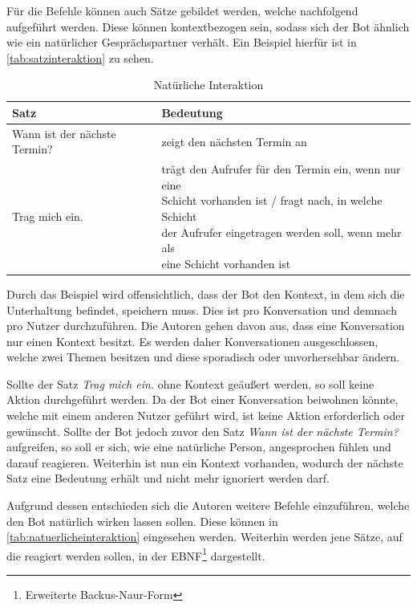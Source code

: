 Für die Befehle können auch Sätze gebildet werden, welche nachfolgend aufgeführt werden. Diese können kontextbezogen sein, sodass sich der Bot ähnlich wie ein natürlicher Gesprächspartner verhält. Ein Beispiel hierfür ist in \autoref{tab:satzinteraktion} zu sehen.

\begin{table}[H]
\centering
\begin{tabular}{|l|l|}
\hline
\textbf{Satz} & \textbf{Bedeutung }\\
 \hline
Wann ist der nächste Termin? & zeigt den nächsten Termin an \\
\hline
Trag mich ein. & \makecell{trägt den Aufrufer für den Termin ein, wenn nur eine\\ Schicht vorhanden ist / fragt nach, in welche Schicht\\ der Aufrufer eingetragen werden soll, wenn mehr als\\ eine Schicht vorhanden ist} \\
\hline
\end{tabular}
\caption{Natürliche Interaktion}
\label{tab:satzinteraktion}
\end{table}

Durch das Beispiel wird offensichtlich, dass der Bot den Kontext, in dem sich die Unterhaltung befindet, speichern muss. Dies ist pro Konversation und demnach pro Nutzer durchzuführen. Die Autoren gehen davon aus, dass eine Konversation nur einen Kontext besitzt. Es werden daher Konversationen ausgeschlossen, welche zwei Themen besitzen und diese sporadisch oder unvorhersehbar ändern.

Sollte der Satz \textit{Trag mich ein.} ohne Kontext geäußert werden, so soll keine Aktion durchgeführt werden. Da der Bot einer Konversation beiwohnen könnte, welche mit einem anderen Nutzer geführt wird, ist keine Aktion erforderlich oder gewünscht. Sollte der Bot jedoch zuvor den Satz \textit{Wann ist der nächste Termin?} aufgreifen, so soll er sich, wie eine natürliche Person, angesprochen fühlen und darauf reagieren. Weiterhin ist nun ein Kontext vorhanden, wodurch der nächste Satz eine Bedeutung erhält und nicht mehr ignoriert werden darf.


Aufgrund dessen entschieden sich die Autoren weitere Befehle einzuführen, welche den Bot natürlich wirken lassen sollen. Diese können in \autoref{tab:natuerlicheinteraktion} eingesehen werden. Weiterhin werden jene Sätze, auf die reagiert werden sollen, in der EBNF\footnote{Erweiterte Backus-Naur-Form} dargestellt.

